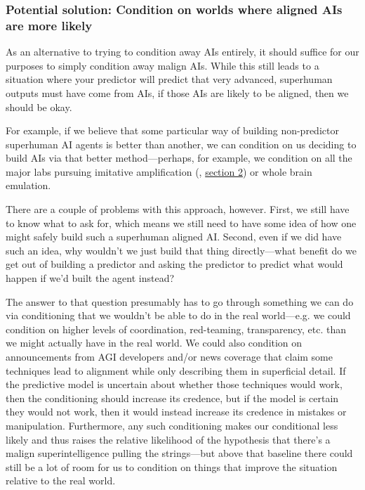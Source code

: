 \documentclass[
  onecolumn,
  natbib,
]{miri-tech-article}
\begin{document}
\subsubsection{Potential solution: Condition on worlds where aligned AIs are more likely}

As an alternative to trying to condition away AIs entirely, it should suffice for our purposes to simply condition away malign AIs. While this still leads to a situation where your predictor will predict that very advanced, superhuman outputs must have come from AIs, if those AIs are likely to be aligned, then we should be okay.

For example, if we believe that some particular way of building non-predictor superhuman AI agents is better than another, we can condition on us deciding to build AIs via that better method---perhaps, for example, we condition on all the major labs pursuing imitative amplification (\cite{11_proposals}, \href{https://www.alignmentforum.org/posts/fRsjBseRuvRhMPPE5/an-overview-of-11-proposals-for-building-safe-advanced-ai#2__Imitative_amplification___intermittent_oversight}{section 2}) or whole brain emulation\cite{wbe_lw}.

There are a couple of problems with this approach, however. First, we still have to know what to ask for, which means we still need to have some idea of how one might safely build such a superhuman aligned AI. Second, even if we did have such an idea, why wouldn't we just build that thing directly---what benefit do we get out of building a predictor and asking the predictor to predict what would happen if we'd built the agent instead?

The answer to that question presumably has to go through something we can do via conditioning that we wouldn't be able to do in the real world---e.g. we could condition on higher levels of coordination, red-teaming, transparency, etc. than we might actually have in the real world. We could also condition on announcements from AGI developers and/or news coverage that claim some techniques lead to alignment while only describing them in superficial detail. If the predictive model is uncertain about whether those techniques would work, then the conditioning should increase its credence, but if the model is certain they would not work, then it would instead increase its credence in mistakes or manipulation. Furthermore, any such conditioning makes our conditional less likely and thus raises the relative likelihood of the hypothesis that there's a malign superintelligence pulling the strings---but above that baseline there could still be a lot of room for us to condition on things that improve the situation relative to the real world.
\end{document}
